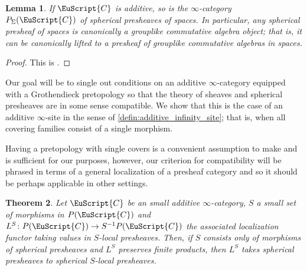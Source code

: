 \documentclass[oneside,a4paper]{amsart}
\newcommand{\euscr}[1]{\EuScript{#1}} %
\newcommand{\ccat}{\euscr{C}} %
\theoremstyle{plain}
\newtheorem{thm}{Theorem}[section]
\newtheorem{lemma}[thm]{Lemma}
\theoremstyle{definition}
\theoremstyle{remark}
\begin{document}
\begin{lemma}
\label{lemma:spherical_presheaves_form_an_additive_category}
If $\ccat$ is additive, so is the $\infty$-category $P_{\Sigma}(\ccat)$ of spherical presheaves of spaces. In particular, any spherical presheaf of spaces is canonically a grouplike commutative algebra object; that is, it can be canonically lifted to a presheaf of grouplike commutative algebras in spaces. 
\end{lemma}

\begin{proof}
This is \cite[C.1.5.3, C.1.5.8]{lurie_spectral_algebraic_geometry}.
\end{proof}

Our goal will be to single out conditions on an additive $\infty$-category equipped with a Grothendieck pretopology so that the theory of sheaves and spherical presheaves are in some sense compatible. We show that this is the case of an additive $\infty$-site in the sense of \cref{defin:additive_infinity_site}; that is, when all covering families consist of a single morphism. 

Having a pretopology with single covers is a convenient assumption to make and is sufficient for our purposes, however, our criterion for compatibility will be phrased in terms of a general localization of a presheaf category and so it should be perhaps applicable in other settings.

\begin{thm}
\label{thm:localizations_compatible_with_spherical_presheaves}
Let $\ccat$ be an small additive $\infty$-category, $S$ a small set of morphisms in $P(\ccat)$ and $L^{S}\colon P(\ccat) \rightarrow S^{-1}P(\ccat)$ the associated localization functor taking values in $S$-local presheaves. Then, if $S$ consists only of morphisms of spherical presheaves and $L^{S}$ preserves finite products, then $L^{S}$ takes spherical presheaves to spherical $S$-local presheaves. 
\end{thm}
\end{document}
